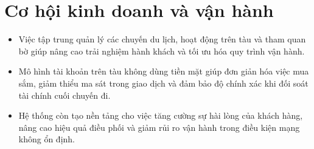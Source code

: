 \section{Cơ hội kinh doanh và vận hành}
\begin{itemize}
    \item Việc tập trung quản lý các chuyến du lịch, hoạt động trên tàu và tham quan bờ giúp nâng cao trải nghiệm hành khách và tối ưu hóa quy trình vận hành.
    \item Mô hình tài khoản trên tàu không dùng tiền mặt giúp đơn giản hóa việc mua sắm, giảm thiểu ma sát trong giao dịch và đảm bảo độ chính xác khi đối soát tài chính cuối chuyến đi.
    \item Hệ thống còn tạo nền tảng cho việc tăng cường sự hài lòng của khách hàng, nâng cao hiệu quả điều phối và giảm rủi ro vận hành trong điều kiện mạng không ổn định.
\end{itemize}